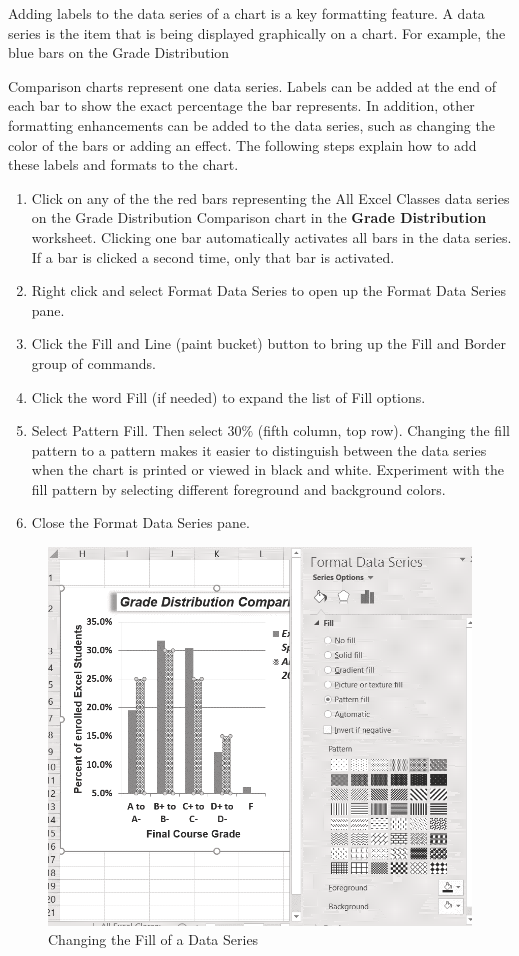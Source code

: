 Adding labels to the data series of a chart is a key formatting feature. A data series is the item that is being displayed graphically on a chart. For example, the blue bars on the Grade Distribution

Comparison charts represent one data series. Labels can be added at the end of each bar to show the exact percentage the bar represents. In addition, other formatting enhancements can be added to the data series, such as changing the color of the bars or adding an effect. The following steps explain how to add these labels and formats to the chart.

\begin{enumerate}
	\item Click on any of the the red bars representing the All Excel Classes data series on the Grade Distribution Comparison chart in the \textbf{Grade Distribution} worksheet. Clicking one bar automatically activates all bars in the data series. If a bar is clicked a second time, only that bar is activated.
	\item Right click and select Format Data Series to open up the Format Data Series pane.
	\item Click the Fill and Line (paint bucket) button to bring up the Fill and Border group of commands.
	\item Click the word Fill (if needed) to expand the list of Fill options.
	\item Select Pattern Fill. Then select $ 30\% $ (fifth column, top row). Changing the fill pattern to a pattern makes it easier to distinguish between the data series when the chart is printed or viewed in black and white. Experiment with the fill pattern by selecting different foreground and background colors.
	\item Close the Format Data Series pane.
\end{enumerate}

\begin{figure}[H]
	\centering
	\includegraphics[width=\maxwidth{.95\linewidth}]{gfx/ch04_fig36}
	\caption{Changing the Fill of a Data Series}
	\label{04:fig36}
\end{figure}


